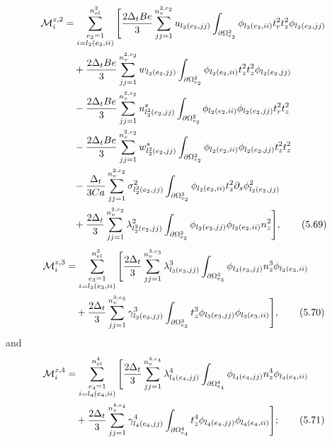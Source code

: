 \documentclass{article}
\begin{document}
\begin{align}
\mathcal{M}_i^{z,2} &= \sum_{\substack{e_2=1\\ i=l_2(e_2,ii)}}^{n_{el}^2} \Bigg[ \frac{2\Delta_t Be}{3} \sum_{jj=1}^{n_v^{2,e_2}} u_{l_2(e_2,jj)} \int_{\partial \Omega_{e_2}^2} \phi_{l_2(e_2,ii)} t_r^2 t_z^2 \phi_{l_2(e_2,jj)} \nonumber\\
&\quad + \frac{2\Delta_t Be}{3} \sum_{jj=1}^{n_v^{2,e_2}} w_{l_2(e_2,jj)} \int_{\partial \Omega_{e_2}^2} \phi_{l_2(e_2,ii)} t_z^2 t_z^2 \phi_{l_2(e_2,jj)} \nonumber\\
&\quad - \frac{2\Delta_t Be}{3} \sum_{jj=1}^{n_v^{2,e_2}} u_{l_2^2(e_2,jj)}^s \int_{\partial \Omega_{e_2}^2} \phi_{l_2(e_2,ii)} \phi_{l_2(e_2,jj)} t_r^2 t_z^2 \nonumber\\
&\quad - \frac{2\Delta_t Be}{3} \sum_{jj=1}^{n_v^{2,e_2}} w_{l_2^2(e_2,jj)}^s \int_{\partial \Omega_{e_2}^2} \phi_{l_2(e_2,ii)} \phi_{l_2(e_2,jj)} t_z^2 t_z^2 \nonumber\\
&\quad - \frac{\Delta_t}{3Ca} \sum_{jj=1}^{n_v^{2,e_2}} \sigma_{l_2^2(e_2,jj)}^2 \int_{\partial \Omega_{e_2}^2} \phi_{l_2(e_2,ii)} t_z^2 \partial_s \phi_{l_2(e_2,jj)}^2 \nonumber\\
&\quad + \frac{2\Delta_t}{3} \sum_{jj=1}^{n_v^{2,e_2}} \lambda_{l_2^2(e_2,jj)}^2 \int_{\partial \Omega_{e_2}^2} \phi_{l_2(e_2,jj)} \phi_{l_2(e_2,ii)} n_z^2 \Bigg], \tag{5.69}
\end{align}
\begin{align}
\mathcal{M}_i^{z,3} &= \sum_{\substack{e_3=1\\ i=l_3(e_3,ii)}}^{n_{el}^3} \Bigg[ \frac{2\Delta_t}{3} \sum_{jj=1}^{n_v^{3,e_3}} \lambda_{l_3(e_3,jj)}^3 \int_{\partial \Omega_{e_3}^3} \phi_{l_3(e_3,jj)} n_z^3 \phi_{l_3(e_3,ii)} \nonumber\\
&\quad + \frac{2\Delta_t}{3} \sum_{jj=1}^{n_v^{3,e_3}} \gamma_{l_3(e_3,jj)}^3 \int_{\partial \Omega_{e_3}^3} t_z^3 \phi_{l_3(e_3,jj)} \phi_{l_3(e_3,ii)} \Bigg], \tag{5.70}
\end{align}
and
\begin{align}
\mathcal{M}_i^{z,4} &= \sum_{\substack{e_4=1\\ i=l_4(e_4,ii)}}^{n_{el}^4} \Bigg[ \frac{2\Delta_t}{3} \sum_{jj=1}^{n_v^{4,e_4}} \lambda_{l_4(e_4,jj)}^4 \int_{\partial \Omega_{e_4}^4} \phi_{l_4(e_4,jj)} n_z^4 \phi_{l_4(e_4,ii)} \nonumber\\
&\quad + \frac{2\Delta_t}{3} \sum_{jj=1}^{n_v^{4,e_4}} \gamma_{l_4(e_4,jj)}^4 \int_{\partial \Omega_{e_4}^4} t_z^4 \phi_{l_4(e_4,jj)} \phi_{l_4(e_4,ii)} \Bigg]; \tag{5.71}
\end{align}
\end{document}
